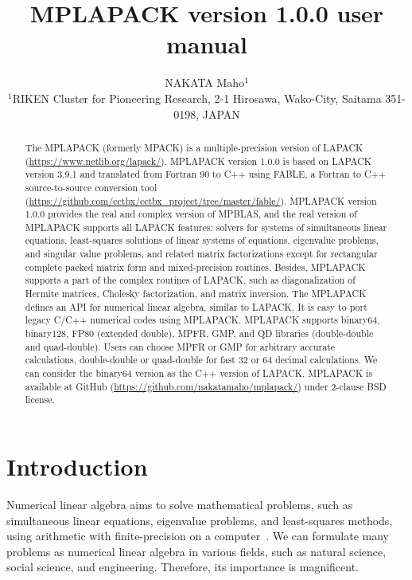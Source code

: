 \documentclass[12pt]{article}
\begin{document}
  
  \title{\sf MPLAPACK version 1.0.0 user manual}
  \author{NAKATA Maho$^1$\\
  \normalsize
  $^1$RIKEN Cluster for Pioneering Research, 2-1 Hirosawa, Wako-City, Saitama 351-0198, JAPAN}

\date{}

\maketitle

\begin{abstract}
The MPLAPACK (formerly MPACK) is a multiple-precision version of LAPACK \\
(\url{https://www.netlib.org/lapack/}).
MPLAPACK version 1.0.0 is based on LAPACK version 3.9.1 and translated from Fortran 90 to C++ using FABLE, a Fortran to C++ source-to-source conversion tool (\url{https://github.com/cctbx/cctbx\_project/tree/master/fable/}). 
MPLAPACK version 1.0.0 provides the real and complex version of MPBLAS, and the real version of MPLAPACK supports all LAPACK features: solvers for systems of simultaneous linear equations, least-squares solutions of linear systems of equations, eigenvalue problems, and singular value problems, and related matrix factorizations except for rectangular complete packed matrix form and mixed-precision routines. Besides, MPLAPACK supports a part of the complex routines of LAPACK, such as diagonalization of Hermite matrices, Cholesky factorization, and matrix inversion. The MPLAPACK defines an API for numerical linear algebra, similar to LAPACK. It is easy to port legacy C/C++ numerical codes using MPLAPACK. MPLAPACK supports binary64, binary128, FP80 (extended double), MPFR, GMP, and QD libraries (double-double and quad-double). Users can choose MPFR or GMP for arbitrary accurate calculations, double-double or quad-double for fast 32 or 64 decimal calculations. We can consider the binary64 version as the C++ version of LAPACK. MPLAPACK is available at GitHub (\url{https://github.com/nakatamaho/mplapack/}) under 2-clause BSD license.
\end{abstract}

\section{Introduction}

Numerical linear algebra aims to solve mathematical problems, such as simultaneous linear equations, eigenvalue problems, and least-squares methods, using arithmetic with finite-precision on a computer~\cite{GoluVanl96}. We can formulate many problems as numerical linear algebra in various fields, such as natural science, social science, and engineering. Therefore, its importance is magnificent. 
\end{document}
